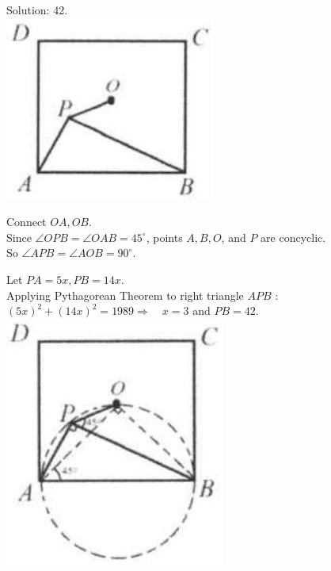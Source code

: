 \documentclass[10pt]{article}
\begin{document}
Solution: 42.\\
\includegraphics[max width=\textwidth, center]{2025_04_17_97bc1f7e44d93c271a88g-204(2)}

Connect \(O A, O B\).\\
Since \(\angle O P B=\angle O A B=45^{\circ}\), points \(A, B, O\), and \(P\) are concyclic.\\
So \(\angle A P B=\angle A O B=90^{\circ}\).


Let \(P A=5 x, P B=14 x\).\\
Applying Pythagorean Theorem to right triangle \(A P B\) :\\
\((5 x)^{2}+(14 x)^{2}=1989 \Rightarrow \quad x=3\) and \(P B=42\).\\
\includegraphics[max width=\textwidth, center]{2025_04_17_97bc1f7e44d93c271a88g-205}
\end{document}
